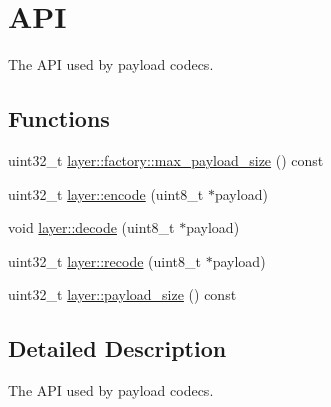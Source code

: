 \hypertarget{group__payload__codec__api}{\section{A\-P\-I}
\label{group__payload__codec__api}
}


The A\-P\-I used by payload codecs.  


\subsection*{Functions}
\begin{DoxyCompactItemize}
\item 
uint32\-\_\-t \hyperlink{group__payload__codec__api_gae38feedd50372252ded284d12bcf9dab}{layer\-::factory\-::max\-\_\-payload\-\_\-size} () const 
\item 
uint32\-\_\-t \hyperlink{group__payload__codec__api_ga8d9deb3b1062947bb305e938ff20689b}{layer\-::encode} (uint8\-\_\-t $\ast$payload)
\item 
void \hyperlink{group__payload__codec__api_gaa19a3256acd51356401762ee79d21d95}{layer\-::decode} (uint8\-\_\-t $\ast$payload)
\item 
uint32\-\_\-t \hyperlink{group__payload__codec__api_ga210cf0d2ea9c66ac32557ac265eb95c6}{layer\-::recode} (uint8\-\_\-t $\ast$payload)
\item 
uint32\-\_\-t \hyperlink{group__payload__codec__api_gae41a009ed90022aab131c1078bf8c773}{layer\-::payload\-\_\-size} () const 
\end{DoxyCompactItemize}


\subsection{Detailed Description}
The A\-P\-I used by payload codecs. 

